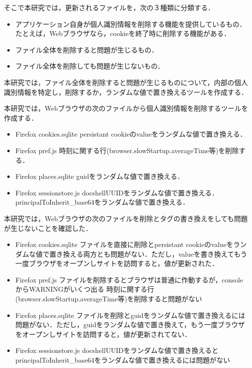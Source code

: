 \documentclass[submit,techrep]{ipsj}
\begin{document}
\begin{itemize}
そこで本研究では，更新されるファイルを，次の３種類に分類する．
\begin{itemize}
\item
アプリケーション自身が個人識別情報を削除する機能を提供しているもの．たとえば，Webブラウザなら，cookieを終了時に削除する機能がある．
\item
ファイル全体を削除すると問題が生じるもの．
\item
ファイル全体を削除しても問題が生じないもの．
\end{itemize}

本研究では，ファイル全体を削除すると問題が生じるものについて，内部の個人識別情報を特定し，削除するか，ランダムな値で置き換えるツールを作成する．

本研究では，Webブラウザの次のファイルから個人識別情報を削除するツールを作成する．

\begin{itemize}
\item
Firefox cookies.sqlite
persistant cookieのvalueをランダムな値で置き換える．
\item
Firefox pref.js
時刻に関する行(browser.slowStartup.averageTime等)を削除する．

\item
Firefox places.sqlite
guidをランダムな値で置き換える．
\item
Firefox sessionstore.js
docshellUUIDをランダムな値で置き換える．
principalToInherit\_base64をランダムな値で置き換える．
\end{itemize}

本研究では，Webブラウザの次のファイルを削除とタグの書き換えをしても問題が生じないことを確認した．

\begin{itemize}
\item
Firefox cookies.sqlite
ファイルを直接に削除とpersistant cookieのvalueをランダムな値で置き換える両方とも問題がない．ただし，valueを書き換えてもう一度ブラウザをオープンしサイトを訪問すると，値が更新された．
\item
Firefox pref.js
ファイルを削除するとブラウザは普通に作動するが，consoleからWARNINGがいくつ出る
時刻に関する行(browser.slowStartup.averageTime等)を削除すると問題がない

\item
Firefox places.sqlite
ファイルを削除とguidをランダムな値で置き換えるには問題がない．ただし，guidをランダムな値で置き換えて，もう一度ブラウザをオープンしサイトを訪問すると，値が更新されてない．
\item
Firefox sessionstore.js
docshellUUIDをランダムな値で置き換えるとprincipalToInherit\_base64をランダムな値で置き換えるには問題がない


\end{itemize}
\end{itemize}
\end{document}
